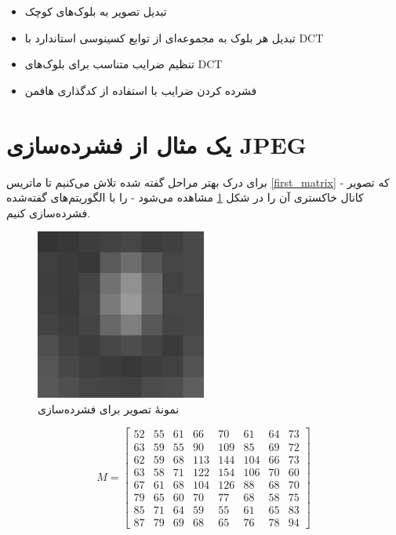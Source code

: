 \begin{itemize}
        \item تبدیل تصویر به بلوک‌های کوچک 
        \item تبدیل هر بلوک به مجموعه‌ای از توابع کسینوسی استاندارد با DCT
        \item تنظیم ضرایب متناسب برای بلوک‌های DCT 
        \item فشرده کردن ضرایب با استفاده از کدگذاری هافمن
\end{itemize}

\section{یک مثال از فشرده‌سازی JPEG}
برای درک بهتر مراحل گفته شده تلاش می‌کنیم تا ماتریس \ref{first_matrix} - که تصویر کانال خاکستری آن را در شکل 
\ref{jpeg_example}
مشاهده می‌شود -
را با الگوریتم‌های گفته‌شده فشرده‌سازی کنیم.
\begin{figure}[]
        \centering
        \includegraphics[width=0.5\textwidth]{figs/jpeg_block.png}
        \caption[نمونهٔ تصویر برای فشرده‌سازی]{نمونهٔ تصویر برای فشرده‌سازی \cite{jpeg_example}}
        \label{jpeg_example}
\end{figure}
\begin{equation}      
        M = \begin{bmatrix}
                52 & 55 & 61 & 66 & 70 & 61 & 64 & 73\\
                63 & 59 & 55 & 90 & 109 & 85 & 69 & 72 \\
                62 & 59 & 68 & 113 & 144 & 104 & 66 & 73 \\
                63 & 58 & 71 & 122 & 154 & 106 & 70 & 60 \\
                67 & 61 & 68 & 104 & 126 & 88 & 68 & 70 \\
                79 & 65 & 60 & 70 & 77 & 68 & 58 & 75 \\
                85 & 71 & 64 & 59 & 55 & 61 & 65 & 83 \\
                87 & 79 & 69 & 68 & 65 & 76 & 78 & 94 

        \end{bmatrix}
        \label{first_matrix}
\end{equation}
